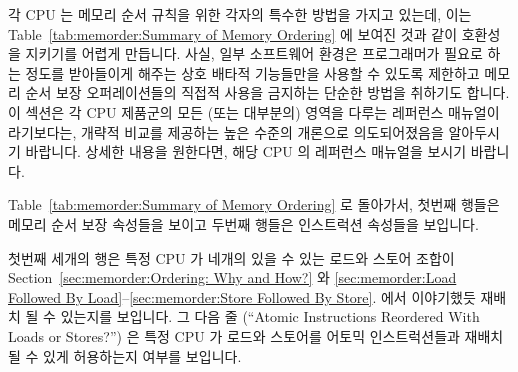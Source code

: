 각 CPU 는 메모리 순서 규칙을 위한 각자의 특수한 방법을 가지고 있는데, 이는
Table~\ref{tab:memorder:Summary of Memory Ordering} 에 보여진 것과 같이
호환성을 지키기를 어렵게 만듭니다.
사실, 일부 소프트웨어 환경은 프로그래머가 필요로 하는 정도를 받아들이게 해주는
상호 배타적 기능들만을 사용할 수 있도록 제한하고 메모리 순서 보장
오퍼레이션들의 직접적 사용을 금지하는 단순한 방법을 취하기도 합니다.
이 섹션은 각 CPU 제품군의 모든 (또는 대부분의) 영역을 다루는 레퍼런스
매뉴얼이라기보다는, 개략적 비교를 제공하는 높은 수준의 개론으로 의도되어졌음을
알아두시기 바랍니다.
상세한 내용을 원한다면, 해당 CPU 의 레퍼런스 매뉴얼을 보시기 바랍니다.

Table~\ref{tab:memorder:Summary of Memory Ordering} 로 돌아가서, 첫번째 행들은
메모리 순서 보장 속성들을 보이고 두번째 행들은 인스트럭션 속성들을 보입니다.

첫번째 세개의 행은 특정 CPU 가 네개의 있을 수 있는 로드와 스토어 조합이
Section~\ref{sec:memorder:Ordering: Why and How?} 와
\ref{sec:memorder:Load Followed By Load}--\ref{sec:memorder:Store Followed By Store}.
에서 이야기했듯 재배치 될 수 있는지를 보입니다.
그 다음 줄 (``Atomic Instructions Reordered With Loads or Stores?'') 은 특정
CPU 가 로드와 스토어를 어토믹 인스트럭션들과 재배치 될 수 있게 허용하는지
여부를 보입니다.

